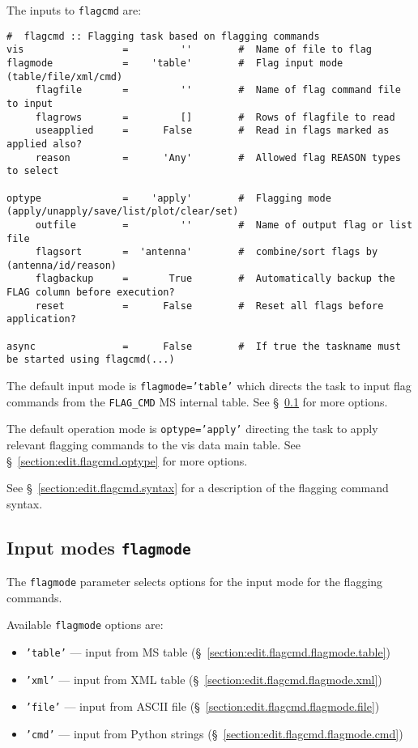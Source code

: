 The inputs to {\tt flagcmd} are:
\small
\begin{verbatim}
#  flagcmd :: Flagging task based on flagging commands
vis                 =         ''        #  Name of file to flag
flagmode            =    'table'        #  Flag input mode (table/file/xml/cmd)
     flagfile       =         ''        #  Name of flag command file to input
     flagrows       =         []        #  Rows of flagfile to read
     useapplied     =      False        #  Read in flags marked as applied also?
     reason         =      'Any'        #  Allowed flag REASON types to select

optype              =    'apply'        #  Flagging mode (apply/unapply/save/list/plot/clear/set)
     outfile        =         ''        #  Name of output flag or list file
     flagsort       =  'antenna'        #  combine/sort flags by (antenna/id/reason)
     flagbackup     =       True        #  Automatically backup the FLAG column before execution?
     reset          =      False        #  Reset all flags before application?

async               =      False        #  If true the taskname must be started using flagcmd(...)
\end{verbatim}
\normalsize

The default input mode is {\tt flagmode='table'} which directs the
task to input flag commands from the {\tt FLAG\_CMD} MS internal
table. See \S~\ref{section:edit.flagcmd.flagmode} for more options.

The default operation mode is {\tt optype='apply'} directing the
task to apply relevant flagging commands to the vis data main table.
See \S~\ref{section:edit.flagcmd.optype} for more options.

See \S~\ref{section:edit.flagcmd.syntax} for a description of the
flagging command syntax.

\subsection{Input modes {\tt flagmode}}
\label{section:edit.flagcmd.flagmode}

The {\tt flagmode} parameter selects options for the input mode for
the flagging commands.

Available {\tt flagmode} options are:
\begin{itemize}
   \item {\tt 'table'} --- input from MS table (\S~\ref{section:edit.flagcmd.flagmode.table})
   \item {\tt 'xml'} --- input from XML table (\S~\ref{section:edit.flagcmd.flagmode.xml})
   \item {\tt 'file'} --- input from ASCII file (\S~\ref{section:edit.flagcmd.flagmode.file})
   \item {\tt 'cmd'} --- input from Python strings (\S~\ref{section:edit.flagcmd.flagmode.cmd})
\end{itemize}

